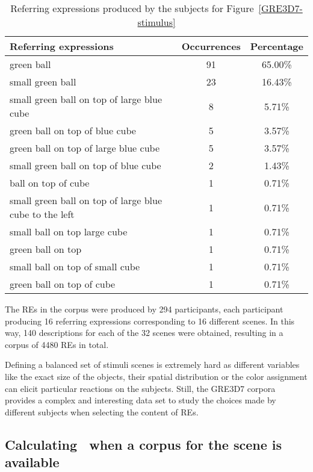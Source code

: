 \begin{table}[h!]
\begin{center}
\begin{tabular}{|l|c|c|}
\hline
Referring expressions & Occurrences & Percentage \\
\hline
green ball & 91 & 65.00\% \\
small green ball & 23 & 16.43\% \\
small green ball on top of large blue cube & 8 & 5.71\% \\
green ball on top of blue cube & 5 & 3.57\% \\
green ball on top of large blue cube & 5 & 3.57\% \\
small green ball on top of blue cube & 2 & 1.43\% \\
ball on top of cube & 1 & 0.71\% \\
small green ball on top of large blue cube to the left & 1 & 0.71\% \\
small ball on top large cube & 1 & 0.71\% \\
green ball on top & 1 & 0.71\% \\
small ball on top of small cube & 1 & 0.71\% \\
green ball on top of cube & 1 & 0.71\% \\
\hline
\end{tabular}
\caption{Referring expressions produced by the subjects for Figure~\ref{GRE3D7-stimulus}}\label{corpus-distribution}
\end{center}
\end{table}

The REs in the corpus were produced by 294 participants, each participant producing 16 referring expressions corresponding to 16 different scenes. In this way, 140 descriptions for each of the 32 scenes were obtained, resulting in a corpus of 4480 REs in total. 

Defining a balanced set of stimuli scenes is extremely hard as different variables like the exact size of the objects, their spatial distribution or the color assignment can elicit particular reactions on the subjects.  Still, the GRE3D7 corpora provides a complex and interesting data set to study the choices made by different subjects when selecting the content of REs. 


\subsection{Calculating \puse\ when a corpus for the scene is available}

